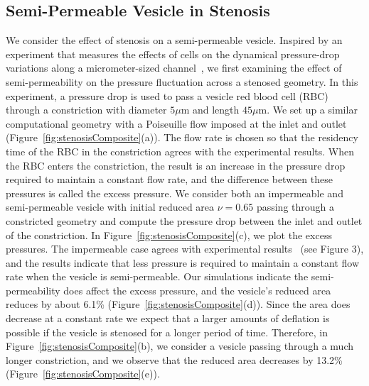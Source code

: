 \documentclass[9pt,twocolumn,twoside,lineno]{pnas-new}
\newif\ifTikz
\begin{document}
\subsection*{Semi-Permeable Vesicle in Stenosis}
We consider the effect of stenosis on a semi-permeable vesicle. Inspired
by an experiment that measures the effects of cells on the dynamical
pressure-drop variations along a micrometer-sized
channel~\cite{abk-fai-sto2006}, we first examining the effect of
semi-permeability on the pressure fluctuation across a stenosed
geometry. In this experiment, a pressure drop is used to pass a vesicle
red blood cell (RBC) through a constriction with diameter $5\mu$m and
length $45\mu$m. We set up a similar computational geometry with a
Poiseuille flow imposed at the inlet and outlet
(Figure~\ref{fig:stenosisComposite}(a)). The flow rate is chosen so that
the residency time of the RBC in the constriction agrees with the
experimental results. When the RBC enters the constriction, the result
is an increase in the pressure drop required to maintain a constant flow
rate, and the difference between these pressures is called the excess
pressure. We consider both an impermeable and semi-permeable vesicle
with initial reduced area $\nu = 0.65$ passing through a constricted
geometry and compute the pressure drop between the inlet and outlet of
the constriction. In Figure~\ref{fig:stenosisComposite}(c), we plot the
excess pressures. The impermeable case agrees with experimental
results~\cite{abk-fai-sto2006} (see Figure 3), and the results indicate
that less pressure is required to maintain a constant flow rate when the
vesicle is semi-permeable. Our simulations indicate the
semi-permeability does affect the excess pressure, and the vesicle's
reduced area reduces by about 6.1\%
(Figure~\ref{fig:stenosisComposite}(d)). Since the area does decrease at
a constant rate we expect that a larger amounts of deflation is possible
if the vesicle is stenosed for a longer period of time. Therefore, in
Figure~\ref{fig:stenosisComposite}(b), we consider a vesicle passing
through a much longer constriction, and we observe that the reduced area
decreases by 13.2\% (Figure~\ref{fig:stenosisComposite}(e)).

\begin{figure*}[htp]
  \ifTikz
  
  \fi
  \caption{\label{fig:stenosisComposite} (a) A semi-permeable vesicle
  passing through a constricted geometry similar to the experimental
  device in~\cite{abk-fai-sto2006}. (b) A semi-permeable vesicle passing
  through a constricted geometry that is over five times longer. (c) The
  excess pressure of an impermeable and semi-permeable vesicle in the
  short geometry in (a). (d) The reduced area of the semi-permeable
  vesicle in the short geometry in (a). (e) The reduced area of the
  semi-permeable vesicle in the long geometry in (b). In parts (c), (d),
  and (e), the horizontal axis is the x-coordinate of the vesicle's
  center of mass.}
\end{figure*}
\end{document}
